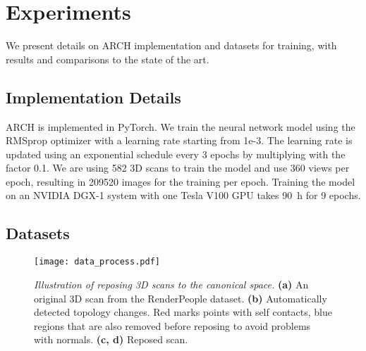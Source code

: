 \documentclass[10pt,twocolumn,letterpaper]{article}
\newcommand{\beforefigcaption}{\vspace{-4mm}}
\newcommand{\afterfigcaption}{\vspace{-4mm}}
\newcommand{\beforesection}{\vspace{-1mm}}
\newcommand{\aftersection}{\vspace{-1mm}}
\newcommand{\beforesubsection}{\vspace{0mm}}
\begin{document}
\beforesection
\section{Experiments} \label{sec:experiments}
\aftersection

We present details on ARCH implementation and datasets for training, with results and comparisons to the state of the art.


\beforesubsection
\subsection{Implementation Details}
\aftersection



ARCH is implemented in PyTorch. We train the neural network model using the RMSprop optimizer with a learning rate starting from 1e-3. The learning rate is updated using an exponential schedule every 3 epochs by multiplying with the factor \num{0.1}. We are using \num{582} 3D scans to train the model and use \num{360} views per epoch, resulting in \num{209520} images for the training per epoch. Training the model on an NVIDIA DGX-1 system with one Tesla V100 GPU takes \SI{90}{h} for 9 epochs.

\beforesubsection
\subsection{Datasets}
\aftersection

\begin{figure}
\centering
\texttt{[image: data\_process.pdf]}
\beforefigcaption
\vspace{3mm}
\caption{\textit{Illustration of reposing 3D scans to the canonical space.} \textbf{(a)} An original 3D scan from the RenderPeople dataset. \textbf{(b)} Automatically detected topology changes. Red marks points with self contacts, blue regions that are also removed before reposing to avoid problems with normals. \textbf{(c, d)} Reposed scan.}
\afterfigcaption
\label{fig:repose}
\end{figure}
\end{document}
